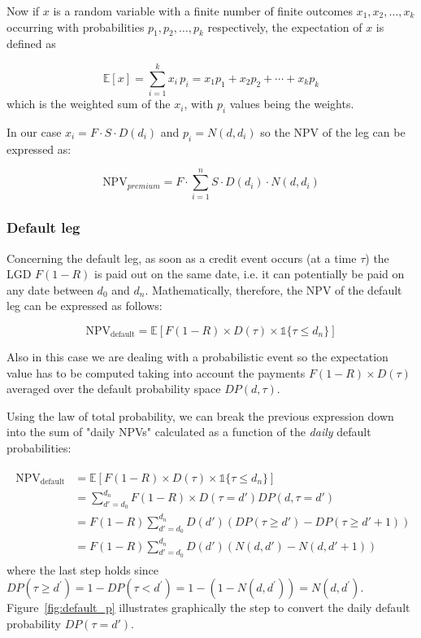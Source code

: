 Now if \(x\) is a random variable with a finite number of finite outcomes
\(x_{1},x_{2},\ldots ,x_{k}\) occurring with probabilities
\(p_{1},p_{2},\ldots ,p_{k}\) respectively, the expectation of \(x\) is defined as

\begin{equation}\mathbb{E}[x] = \sum _{i=1}^{k}x_{i}\,p_{i}=x_{1}p_{1}+x_{2}p_{2}+\cdots +x_{k}p_{k}\end{equation}
which is the weighted sum of the \(x_i\), with \(p_{i}\) values being
the weights.

In our case \(x_i = F\cdot S\cdot D(d_i)\) and \(p_i=N(d, d_i)\) so the NPV of the
leg can be expressed as:

\begin{equation}\textrm{NPV}_{premium} = F\cdot \sum_{i=1}^{n} S \cdot D(d_i) \cdot N(d, d_i)\end{equation}

\subsubsection{Default leg}\label{default-leg}

Concerning the default leg, as soon as a credit event occurs (at a time $\tau$) the LGD \(F(1-R)\) is paid out on the same date, i.e. it can potentially be paid on any date between \(d_0\) and \(d_n\). Mathematically, therefore, the NPV of the default leg can be expressed as follows:

\begin{equation}
\mathrm{NPV_{default}} =\mathbb{E}[F(1-R) \times D(\tau) \times \mathbb{1} \{\tau \leq d_n\} ]
\end{equation}

Also in this case we are dealing with a probabilistic event so the expectation value has to be computed taking into account the payments $F(1-R)\times D(\tau)$ averaged over the default probability space $DP(d, \tau)$. 

Using the law of total probability, we can break the previous expression down into the sum
of "daily NPVs" calculated as a function of the \emph{daily} default
probabilities:

\begin{align}
\begin{split}
\mathrm{NPV_{default}} &= \mathbb{E}[F(1-R) \times D(\tau) \times \mathbb{1}\{\tau \leq d_n\} ] \\
&= \sum_{d'=d_0}^{d_n} F(1-R) \times D(\tau = d') DP(d, \tau = d') \\
&= F(1-R) \sum_{d'=d_0}^{d_n} D(d') \left(DP(\tau \geq d') - DP( \tau \geq d'+1) \right) \\
&= F(1-R) \sum_{d'=d_0}^{d_n} D(d') \left( N(d, d') - N(d, d'+1) \right)
\end{split}
\end{align}
where the last step holds since $DP(\tau\geq d^{'}) = 1 - DP(\tau < d^{'}) = 1 - (1-N(d, d^{'})) = N(d, d^{'})$. 
Figure~\ref{fig:default_p} illustrates graphically the step to convert the daily default probability $DP(\tau=d')$.


